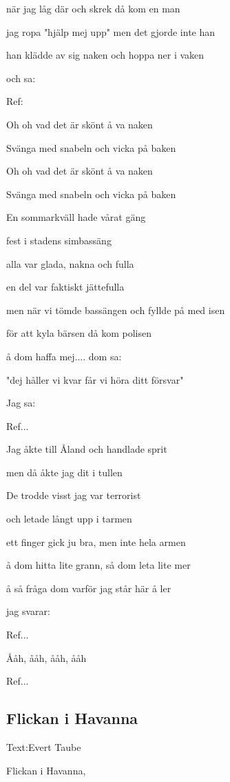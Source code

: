 när jag låg där och skrek då kom en man

jag ropa "hjälp mej upp" men det gjorde inte han

han klädde av sig naken och hoppa ner i vaken 

och sa:\bigskip

Ref:

Oh oh vad det är skönt å va naken

Svänga med snabeln och vicka på baken

Oh oh vad det är skönt å va naken

Svänga med snabeln och vicka på baken\bigskip


En sommarkväll hade vårat gäng 

fest i stadens simbassäng 

alla var glada, nakna och fulla

en del var faktiskt jättefulla

men när vi tömde bassängen och fyllde på med isen 

för att kyla bärsen då kom polisen

å dom haffa mej.... dom sa:

"dej håller vi kvar får vi höra ditt försvar"\bigskip

Jag sa:

Ref... \bigskip

Jag åkte till Åland och handlade sprit 

men då åkte jag dit i tullen

De trodde visst jag var terrorist 

och letade långt upp i tarmen 

ett finger gick ju bra, men inte hela armen

å dom hitta lite grann, så dom leta lite mer

å så fråga dom varför jag står här å ler

jag svarar:\bigskip

Ref...\bigskip

Ååh, ååh, ååh, ååh\bigskip

Ref... \bigskip



\subsection{\textbf{Flickan i Havanna}}

Text:Evert Taube\bigskip

Flickan i Havanna,

